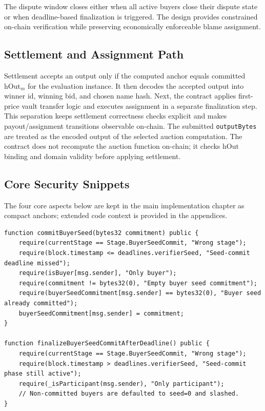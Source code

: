 \documentclass[final,twoside]{vutinfth}
\begin{document}
The dispute window closes either when all active buyers close their dispute
state or when deadline-based finalization is triggered.
The design provides constrained on-chain verification while preserving economically enforceable blame assignment.

\subsection{Settlement and Assignment Path}
Settlement accepts an output only if the computed anchor equals committed $\mathrm{hOut}_m$ for the evaluation instance.
It then decodes the accepted output into winner id, winning bid, and chosen name hash.
Next, the contract applies first-price vault transfer logic and executes assignment in a separate finalization step.
This separation keeps settlement correctness checks explicit and makes payout/assignment transitions observable on-chain.
The submitted \texttt{outputBytes} are treated as the encoded output of the
selected auction computation. The contract does not recompute the auction
function on-chain; it checks $\mathrm{hOut}$ binding and domain validity before
applying settlement.

\subsection{Core Security Snippets}
The four core aspects below are kept in the main implementation chapter as
compact anchors; extended code context is provided in the appendices.

\begin{lstlisting}[style=soliditysnippet,caption={Stage/role gating and timeout-enforced liveness in seed commit phase.},label={lst:seed-commit-liveness}]
function commitBuyerSeed(bytes32 commitment) public {
    require(currentStage == Stage.BuyerSeedCommit, "Wrong stage");
    require(block.timestamp <= deadlines.verifierSeed, "Seed-commit deadline missed");
    require(isBuyer[msg.sender], "Only buyer");
    require(commitment != bytes32(0), "Empty buyer seed commitment");
    require(buyerSeedCommitment[msg.sender] == bytes32(0), "Buyer seed already committed");
    buyerSeedCommitment[msg.sender] = commitment;
}

function finalizeBuyerSeedCommitAfterDeadline() public {
    require(currentStage == Stage.BuyerSeedCommit, "Wrong stage");
    require(block.timestamp > deadlines.verifierSeed, "Seed-commit phase still active");
    require(_isParticipant(msg.sender), "Only participant");
    // Non-committed buyers are defaulted to seed=0 and slashed.
}
\end{lstlisting}
\end{document}
